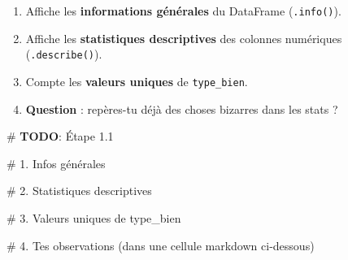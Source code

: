 \documentclass[
  french,
  11pt,
  a4paper,
]{scrbook}
\newenvironment{Shaded}{}{}
\newcommand{\AlertTok}[1]{\textcolor[rgb]{1.00,0.33,0.33}{\textbf{#1}}}
\newcommand{\CommentTok}[1]{\textcolor[rgb]{0.42,0.45,0.49}{#1}}
\providecommand{\tightlist}{%
  \setlength{\itemsep}{0pt}\setlength{\parskip}{0pt}}
\begin{document}
\begin{tcolorbox}[enhanced jigsaw, arc=.35mm, bottomrule=.15mm, bottomtitle=1mm, breakable, colback=white, colbacktitle=quarto-callout-note-color!10!white, colframe=quarto-callout-note-color-frame, coltitle=black, left=2mm, leftrule=.75mm, opacityback=0, opacitybacktitle=0.6, rightrule=.15mm, title={📝 À faire}, titlerule=0mm, toprule=.15mm, toptitle=1mm]

\begin{enumerate}
\def\labelenumi{\arabic{enumi}.}
\tightlist
\item
  Affiche les \textbf{informations générales} du DataFrame
  (\texttt{.info()}).
\item
  Affiche les \textbf{statistiques descriptives} des colonnes numériques
  (\texttt{.describe()}).
\item
  Compte les \textbf{valeurs uniques} de \texttt{type\_bien}.
\item
  \textbf{Question} : repères-tu déjà des choses bizarres dans les stats
  ?
\end{enumerate}

\end{tcolorbox}

\begin{Shaded}
\begin{Highlighting}[]
\CommentTok{\# }\AlertTok{TODO}\CommentTok{: Étape 1.1}

\CommentTok{\# 1. Infos générales}


\CommentTok{\# 2. Statistiques descriptives}


\CommentTok{\# 3. Valeurs uniques de type\_bien}


\CommentTok{\# 4. Tes observations (dans une cellule markdown ci{-}dessous)}
\end{Highlighting}
\end{Shaded}
\end{document}
